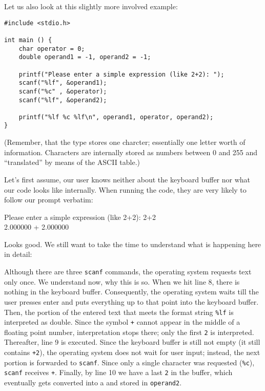 Let us also look at this slightly more involved example:

\begin{codebox}[enterExpression.c]
\begin{verbatim}
#include <stdio.h>

int main () {
    char operator = 0;
    double operand1 = -1, operand2 = -1;

    printf("Please enter a simple expression (like 2+2): ");
    scanf("%lf", &operand1);
    scanf("%c" , &operator);
    scanf("%lf", &operand2);

    printf("%lf %c %lf\n", operand1, operator, operand2);
}
\end{verbatim}
 \label{code:scanf_lfclf}
\end{codebox}
(Remember, that the type  stores one charcter; essentially one letter worth of information. Characters are internally stored as numbers between 0 and 255 and \enquote{translated} by means of the ASCII table.)

Let's first assume, our user knows neither about the keyboard buffer nor what our code looks like internally. When running the code, they are very likely to follow our prompt verbatim:
\begin{cmdbox}
Please enter a simple expression (like 2+2): 2+2 \\
2.000000 + 2.000000
\end{cmdbox}
Looks good. We still want to take the time to understand what is happening here in detail:

Although there are three \texttt{scanf} commands, the operating system requests text only once. We understand now, why this is so. When we hit line 8, there is nothing in the keyboard buffer. Consequently, the operating system waits till the user presses enter and puts everything up to that point into the keyboard buffer. Then, the portion of the entered text that meets the format string \texttt{\%lf} is interpreted as double. Since the symbol \texttt{+} cannot appear in the middle of a floating point number, interpretation stops there; only the first \texttt{2} is interpreted. Thereafter, line 9 is executed. Since the keyboard buffer is still not empty (it still contains \texttt{+2}), the operating system does not wait for user input; instead, the next portion is forwarded to \texttt{scanf}. Since only a single character was requested (\texttt{\%c}), \texttt{scanf} receives \texttt{+}. Finally, by line 10 we have a last \texttt{2} in the buffer, which eventually gets converted into a  and stored in \texttt{operand2}.


